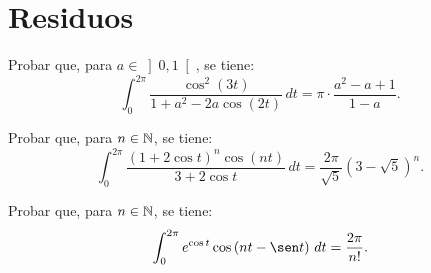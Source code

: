 \section{Residuos}

\begin{ejercicio}
    Probar que, para $a \in \left]0,1\right[$, se tiene:
    \begin{equation*}
        \int_0^{2\pi} \frac{\cos^2(3t)}{1 + a^2 - 2a \cos(2t)} \, dt = \pi\cdot \frac{a^2 - a + 1}{1 - a}.
    \end{equation*}
\end{ejercicio}

\begin{ejercicio}
    Probar que, para $n \in \mathbb{N}$, se tiene:
    \begin{equation*}
        \int_0^{2\pi} \frac{(1 + 2\cos t)^n \cos(nt)}{3 + 2\cos t} \, dt = \dfrac{2\pi}{\sqrt{5}} \left(3 - \sqrt{5}\right)^n.
    \end{equation*}
\end{ejercicio}

\begin{ejercicio}
    Probar que, para $n \in \mathbb{N}$, se tiene:
    \begin{equation*}
        \int_0^{2\pi} e^{\cos t} \cos\left(n t - \sen t\right) \, dt = \frac{2\pi}{n!}.
    \end{equation*}
\end{ejercicio}

